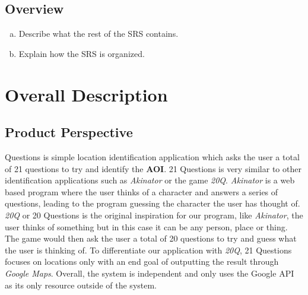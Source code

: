 \documentclass[titlepage]{article}
\begin{document}
		\subsection{Overview}
		\label{sub:overview}
		\begin{enumerate}[a)]
			\item Describe what the rest of the SRS contains.
			\item Explain how the SRS is organized.
		\end{enumerate}
		
		
		
		\section{Overall Description}
		\label{sec:overall_description}
		
		\subsection{Product Perspective}
		\label{sub:product_perspective}
			\indent {} Questions is simple location identification application which asks the user a total of 21 questions to try and identify the \textbf{AOI}. 21 Questions is very similar to other identification applications such as \textit{Akinator} or the game \textit{20Q}. \textit{Akinator} is a web based program where the user thinks of a character and answers a series of questions, leading to the program guessing the character the user has thought of. \textit{20Q} or 20 Questions is the original inspiration for our program, like \textit{Akinator}, the user thinks of something but in this case it can be any person, place or thing. The game would then ask the user a total of 20 questions to try and guess what the user is thinking of. To differentiate our application with \textit{20Q}, 21 Questions focuses on locations only with an end goal of outputting the result through \textit{Google Maps}. Overall, the system is independent and only uses the Google API as its only resource outside of the system.
		
\end{document}
